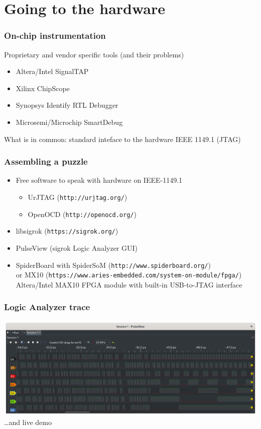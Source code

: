 \section{Going to the hardware}

\begin{frame}
\frametitle{On-chip instrumentation}
Proprietary and vendor specific tools (and their problems)
\begin{itemize}
  \item Altera/Intel SignalTAP
  \item Xilinx ChipScope
  \item Synopsys Identify RTL Debugger
  \item Microsemi/Microchip SmartDebug
\end{itemize}
What is in common: standard inteface to the hardware IEEE 1149.1
(JTAG)
\end{frame}

\begin{frame}
\frametitle{Assembling a puzzle}
\begin{itemize}
  \item Free software to speak with hardware on IEEE-1149.1
  \begin{itemize}
    \item UrJTAG (\texttt{http://urjtag.org/})
    \item OpenOCD (\texttt{http://openocd.org/})
  \end{itemize}
  \item libsigrok (\texttt{https://sigrok.org/})
  \item PulseView (sigrok Logic Analyzer GUI)
  \item SpiderBoard with SpiderSoM
  (\texttt{http://www.spiderboard.org/})\\
  or MX10 (\texttt{https://www.aries-embedded.com/system-on-module/fpga/})\\
  Altera/Intel MAX10 FPGA module with built-in USB-to-JTAG interface
\end{itemize}
\end{frame}

\begin{frame}
  \frametitle{Logic Analyzer trace}
  \includegraphics[width=\textwidth]{pulseview.png}
  \dots and live demo
\end{frame}

